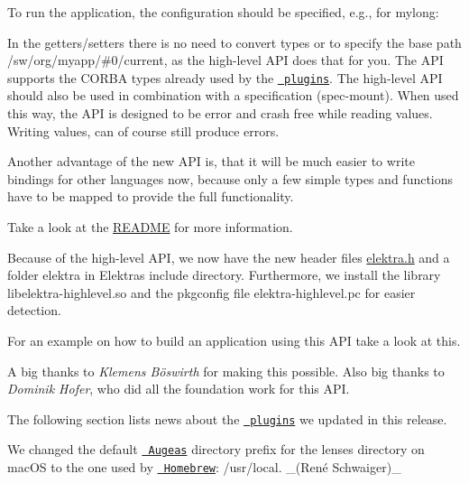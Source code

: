 To run the application, the configuration should be specified, e.\+g., for mylong\+:


\begin{DoxyCode}{0}
\end{DoxyCode}


In the getters/setters there is no need to convert types or to specify the base path {\ttfamily /sw/org/myapp/\#0/current}, as the high-\/level A\+PI does that for you. The A\+PI supports the C\+O\+R\+BA types already used by the \href{https://www.libelektra.org/plugins/type}{\texttt{ plugins}}. The high-\/level A\+PI should also be used in combination with a specification ({\ttfamily spec-\/mount}). When used this way, the A\+PI is designed to be error and crash free while reading values. Writing values, can of course still produce errors.

Another advantage of the new A\+PI is, that it will be much easier to write bindings for other languages now, because only a few simple types and functions have to be mapped to provide the full functionality.

Take a look at the \mbox{\hyperlink{src_libs_highlevel_README_md}{R\+E\+A\+D\+ME}} for more information.

Because of the high-\/level A\+PI, we now have the new header files {\ttfamily \mbox{\hyperlink{elektra_8h}{elektra.\+h}}} and a folder {\ttfamily elektra} in Elektra\textquotesingle{}s include directory. Furthermore, we install the library {\ttfamily libelektra-\/highlevel.\+so} and the pkgconfig file {\ttfamily elektra-\/highlevel.\+pc} for easier detection.

For an example on how to build an application using this A\+PI take a look at this.

A big thanks to {\itshape Klemens Böswirth} for making this possible. Also big thanks to {\itshape Dominik Hofer}, who did all the foundation work for this A\+PI.

The following section lists news about the \href{https://www.libelektra.org/plugins/readme}{\texttt{ plugins}} we updated in this release.


\begin{DoxyItemize}
\item We changed the default \href{http://augeas.net}{\texttt{ Augeas}} directory prefix for the lenses directory on mac\+OS to the one used by \href{https://brew.sh}{\texttt{ Homebrew}}\+: {\ttfamily /usr/local}. \+\_\+(René Schwaiger)\+\_\+
\end{DoxyItemize}


